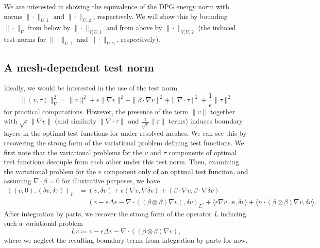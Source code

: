 \documentclass[11pt,onecolumn]{scrartcl}
\newcommand{\seclab}[1]{\label{sec:#1}}
\newcommand{\tanbui}[2]{\textcolor{blue}{\sout{#1}} \textcolor{red}{#2}}
\newcommand{\grad}{\nabla}
\renewcommand{\div}{\grad \cdot}
\begin{document}
We are interested in showing the equivalence of the DPG energy norm with norms $\|\cdot\|_{U,1}$ and $\|\cdot\|_{U,2}$, respectively.  We will show this by bounding $\|\cdot \|_V$ from below by $\|\cdot\|_{V,U,1}$ and from above by $\|\cdot\|_{V,U,2}$ (the induced test norms for $\|\cdot\|_{U,1}$ and $\|\cdot\|_{U,2}$, respectively).  


\subsection{A mesh-dependent test norm}
\seclab{sec:meshDep}
Ideally, we would be interested in the use of the test norm 
\[
\|\left(v,\tau\right)\|_{V}^2 = \|v\|^2 + \epsilon \|\grad v\|^2 + \|\beta \cdot \grad v\|^2 + \| \div \tau\|^2 + \frac{1}{\epsilon}\|\tau\|^2
\]
for practical computations. However, the presence of the term $\|v\|$ together with $\sqrt{\epsilon}\|\grad v\|$ (and similarly $\|\div \tau\|$ and $\frac{1}{\sqrt{\epsilon}}\|\tau\|$ terms) induces boundary layers in the optimal test functions for under-resolved meshes. We can see this by recovering the strong form of the variational problem defining test functions. We first note that the variational problems for the $v$ and $\tau$ components of optimal test functions decouple from each other under this test norm. Then, examining the variational problem for the $v$ component only of an optimal test function, and assuming $\div \beta = 0$ for illustrative purposes, we have 
\begin{align*}
\left(\left(v,0\right),\left(\delta v,\delta\tau\right)\right)_{V} &= (v,\delta v) + \epsilon \left(\grad v,\grad \delta v\right) + \left(\beta \cdot \grad v, \beta \cdot \grad \delta v\right)\\
&= \left(v - \epsilon \Delta v - \div \left(\left(\beta \otimes \beta\right) \grad v\right), \delta v\right)_{L^2} + \langle \epsilon \grad v\cdot n, \delta v\rangle + \langle n\cdot \left(\beta\otimes\beta\right) \grad v , \delta v\rangle.
\end{align*}
After integration by parts, we recover the strong form of the operator $L$ inducing such a variational problem 
\[
Lv \coloneqq v - \epsilon \Delta v - \div \left(\left(\beta \otimes \beta\right) \grad v\right),
\]
where we neglect the resulting boundary terms from integration by parts for now. 
\end{document}
